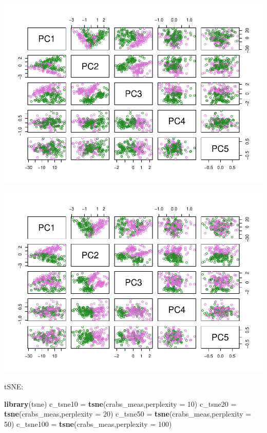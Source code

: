 \documentclass[
]{book}
\newenvironment{Shaded}{\begin{snugshade}}{\end{snugshade}}
\newcommand{\AttributeTok}[1]{\textcolor[rgb]{0.13,0.29,0.53}{#1}}
\newcommand{\DecValTok}[1]{\textcolor[rgb]{0.00,0.00,0.81}{#1}}
\newcommand{\FunctionTok}[1]{\textcolor[rgb]{0.13,0.29,0.53}{\textbf{#1}}}
\newcommand{\NormalTok}[1]{#1}
\newcommand{\OtherTok}[1]{\textcolor[rgb]{0.56,0.35,0.01}{#1}}
\newcommand{\SpecialCharTok}[1]{\textcolor[rgb]{0.81,0.36,0.00}{\textbf{#1}}}
\newcommand{\StringTok}[1]{\textcolor[rgb]{0.31,0.60,0.02}{#1}}
\begin{document}
\includegraphics{_main_files/figure-latex/unnamed-chunk-58-1.pdf}

\begin{Shaded}
\end{Shaded}

\includegraphics{_main_files/figure-latex/unnamed-chunk-58-2.pdf}

tSNE:

\begin{Shaded}
\begin{Highlighting}[]
\FunctionTok{library}\NormalTok{(tsne)}
\NormalTok{c\_tsne10 }\OtherTok{=} \FunctionTok{tsne}\NormalTok{(crabs\_meas,}\AttributeTok{perplexity =} \DecValTok{10}\NormalTok{)}
\NormalTok{c\_tsne20 }\OtherTok{=} \FunctionTok{tsne}\NormalTok{(crabs\_meas,}\AttributeTok{perplexity =} \DecValTok{20}\NormalTok{)}
\NormalTok{c\_tsne50 }\OtherTok{=} \FunctionTok{tsne}\NormalTok{(crabs\_meas,}\AttributeTok{perplexity =} \DecValTok{50}\NormalTok{)}
\NormalTok{c\_tsne100 }\OtherTok{=} \FunctionTok{tsne}\NormalTok{(crabs\_meas,}\AttributeTok{perplexity =} \DecValTok{100}\NormalTok{)}
\end{Highlighting}
\end{Shaded}
\end{document}
